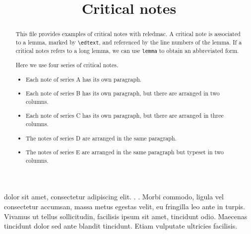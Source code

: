 \documentclass{article}
\begin{document}
\begin{english}
\date{}
\title{Critical notes}
\maketitle
\begin{abstract}
This file provides examples of critical notes with reledmac. 
A critical note is associated to a lemma, marked by \verb+\edtext+, and referenced by the line numbers of the lemma.
If a critical notes refers to a long lemma, we can use \verb+lemma+ to obtain an abbreviated form.

Here we use four series of critical notes. 
\begin{itemize}
\item Each note of series A has its own paragraph. 
\item Each note of series B has its own paragraph, but there are arranged in two columns.  
\item Each note of series C has its own paragraph, but there are arranged in three columns. 
\item The notes of series D are arranged in the same paragraph.
\item The notes of series E are arranged in the same paragraph but typeset in two columns.
\end{itemize}
\end{abstract}
\end{english}

\beginnumbering
\pstart
{}
 dolor sit amet, consectetur adipiscing elit. 
 {
 . 
}.
Morbi commodo, ligula vel consectetur accumsan, massa metus egestas velit, eu fringilla leo ante in turpis. Vivamus ut tellus sollicitudin, facilisis ipsum sit amet, tincidunt odio. Maecenas tincidunt dolor sed ante blandit tincidunt. Etiam vulputate ultricies facilisis.
\pend
\endnumbering
\end{document}

